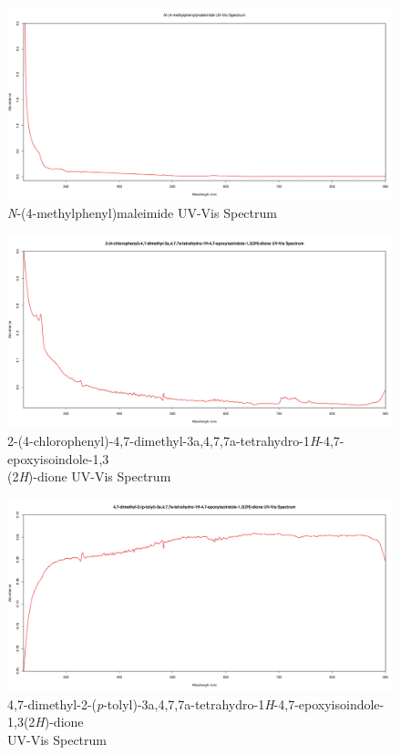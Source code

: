 \documentclass[11pt]{article}
\begin{document}
\begin{figure}[H]
    \centering
    \includegraphics[scale=0.33]{spectra/uvvis10.2.png}
    \caption{\textit{N}-(4-methylphenyl)maleimide UV-Vis Spectrum}
\end{figure}
\begin{figure}[H]
    \centering
    \includegraphics[scale=0.33]{spectra/uvvis9.3.png}
    \caption{2-(4-chlorophenyl)-4,7-dimethyl-3a,4,7,7a-tetrahydro-1\textit{H}-4,7-epoxyisoindole-1,3\\(2\textit{H})-dione UV-Vis Spectrum}
\end{figure}
\begin{figure}[H]
    \centering
    \includegraphics[scale=0.33]{spectra/uvvis10.3.png}
    \caption{4,7-dimethyl-2-(\textit{p}-tolyl)-3a,4,7,7a-tetrahydro-1\textit{H}-4,7-epoxyisoindole-1,3(2\textit{H})-dione \\ UV-Vis Spectrum}
\end{figure}
\end{document}
